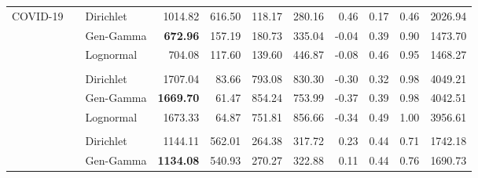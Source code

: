 \documentclass[12pt]{article}
\begin{document}
\begin{table}[!htb]
\begin{tabular}{r | >{\raggedleft\arraybackslash}p{0.55in} | >{\raggedleft\arraybackslash}p{0.85in} | r r r r r r r r}
\multirow{15}{*}{COVID-19} & \multirow{3}{*}{HSGP}
& \cellcolor{delayC!25}Dirichlet & \cellcolor{delayC!25}1014.82 & \cellcolor{delayC!25}616.50 & \cellcolor{delayC!25}118.17 & \cellcolor{delayC!25}280.16 & \cellcolor{delayC!25}0.46 & \cellcolor{delayC!25}0.17 & \cellcolor{delayC!25}0.46 & \cellcolor{delayC!25}2026.94 \\
& & \cellcolor{delayB!25}Gen-Gamma & \cellcolor{delayB!25}\bf 672.96 & \cellcolor{delayB!25}157.19 & \cellcolor{delayB!25}180.73 & \cellcolor{delayB!25}335.04 & \cellcolor{delayB!25}-0.04 & \cellcolor{delayB!25}0.39 & \cellcolor{delayB!25}0.90 & \cellcolor{delayB!25}1473.70 \\
& & \cellcolor{delayA!25}Lognormal & \cellcolor{delayA!25}704.08 & \cellcolor{delayA!25}117.60 & \cellcolor{delayA!25}139.60 & \cellcolor{delayA!25}446.87 & \cellcolor{delayA!25}-0.08 & \cellcolor{delayA!25}0.46 & \cellcolor{delayA!25}0.95 & \cellcolor{delayA!25}1468.27 \\
\\
& \multirow{3}{*}{AR1}
& \cellcolor{delayC!25}Dirichlet & \cellcolor{delayC!25}1707.04 & \cellcolor{delayC!25}83.66 & \cellcolor{delayC!25}793.08 & \cellcolor{delayC!25}830.30 & \cellcolor{delayC!25}-0.30 & \cellcolor{delayC!25}0.32 & \cellcolor{delayC!25}0.98 & \cellcolor{delayC!25}4049.21 \\
& & \cellcolor{delayB!25}Gen-Gamma & \cellcolor{delayB!25}\bf 1669.70 & \cellcolor{delayB!25}61.47 & \cellcolor{delayB!25}854.24 & \cellcolor{delayB!25}753.99 & \cellcolor{delayB!25}-0.37 & \cellcolor{delayB!25}0.39 & \cellcolor{delayB!25}0.98 & \cellcolor{delayB!25}4042.51 \\
& & \cellcolor{delayA!25}Lognormal & \cellcolor{delayA!25}1673.33 & \cellcolor{delayA!25}64.87 & \cellcolor{delayA!25}751.81 & \cellcolor{delayA!25}856.66 & \cellcolor{delayA!25}-0.34 & \cellcolor{delayA!25}0.49 & \cellcolor{delayA!25}1.00 & \cellcolor{delayA!25}3956.61 \\
\\
& \multirow{3}{*}{SIR}
& \cellcolor{delayC!25}Dirichlet & \cellcolor{delayC!25}1144.11 & \cellcolor{delayC!25}562.01 & \cellcolor{delayC!25}264.38 & \cellcolor{delayC!25}317.72 & \cellcolor{delayC!25}0.23 & \cellcolor{delayC!25}0.44 & \cellcolor{delayC!25}0.71 & \cellcolor{delayC!25}1742.18 \\
& & \cellcolor{delayB!25}Gen-Gamma & \cellcolor{delayB!25}\bf 1134.08 & \cellcolor{delayB!25}540.93 & \cellcolor{delayB!25}270.27 & \cellcolor{delayB!25}322.88 & \cellcolor{delayB!25}0.11 & \cellcolor{delayB!25}0.44 & \cellcolor{delayB!25}0.76 & \cellcolor{delayB!25}1690.73 \\

\end{tabular}
\end{table}
\end{document}
